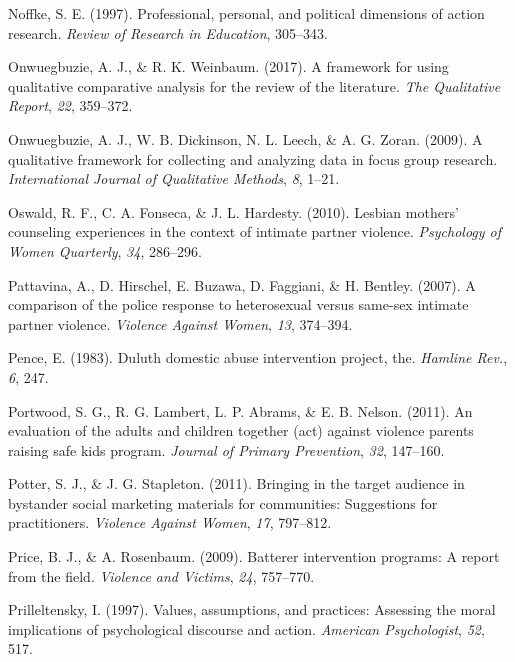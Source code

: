 \documentclass[11pt,]{tufte-book}
\begin{document}
\hypertarget{ref-noffke1997professional}{}
Noffke, S. E. (1997). Professional, personal, and political dimensions
of action research. \emph{Review of Research in Education}, 305--343.

\hypertarget{ref-onwuegbuzie2017framework}{}
Onwuegbuzie, A. J., \& R. K. Weinbaum. (2017). A framework for using
qualitative comparative analysis for the review of the literature.
\emph{The Qualitative Report}, \emph{22}, 359--372.

\hypertarget{ref-onwuegbuzie2009qualitative}{}
Onwuegbuzie, A. J., W. B. Dickinson, N. L. Leech, \& A. G. Zoran.
(2009). A qualitative framework for collecting and analyzing data in
focus group research. \emph{International Journal of Qualitative
Methods}, \emph{8}, 1--21.

\hypertarget{ref-oswald2010lesbian}{}
Oswald, R. F., C. A. Fonseca, \& J. L. Hardesty. (2010). Lesbian
mothers' counseling experiences in the context of intimate partner
violence. \emph{Psychology of Women Quarterly}, \emph{34}, 286--296.

\hypertarget{ref-pattavina2007comparison}{}
Pattavina, A., D. Hirschel, E. Buzawa, D. Faggiani, \& H. Bentley.
(2007). A comparison of the police response to heterosexual versus
same-sex intimate partner violence. \emph{Violence Against Women},
\emph{13}, 374--394.

\hypertarget{ref-pence1983duluth}{}
Pence, E. (1983). Duluth domestic abuse intervention project, the.
\emph{Hamline Rev.}, \emph{6}, 247.

\hypertarget{ref-portwood2011evaluation}{}
Portwood, S. G., R. G. Lambert, L. P. Abrams, \& E. B. Nelson. (2011).
An evaluation of the adults and children together (act) against violence
parents raising safe kids program. \emph{Journal of Primary Prevention},
\emph{32}, 147--160.

\hypertarget{ref-potter2011bringing}{}
Potter, S. J., \& J. G. Stapleton. (2011). Bringing in the target
audience in bystander social marketing materials for communities:
Suggestions for practitioners. \emph{Violence Against Women}, \emph{17},
797--812.

\hypertarget{ref-price2009batterer}{}
Price, B. J., \& A. Rosenbaum. (2009). Batterer intervention programs: A
report from the field. \emph{Violence and Victims}, \emph{24}, 757--770.

\hypertarget{ref-prilleltensky1997values}{}
Prilleltensky, I. (1997). Values, assumptions, and practices: Assessing
the moral implications of psychological discourse and action.
\emph{American Psychologist}, \emph{52}, 517.
\end{document}
